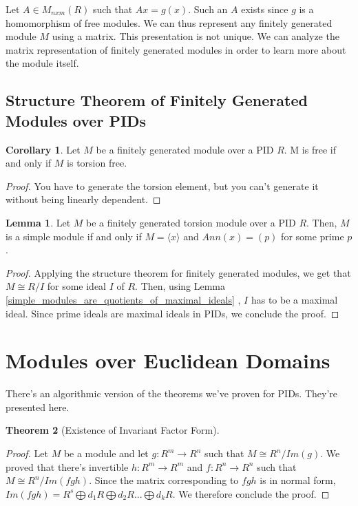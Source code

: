 \documentclass{article}
\theoremstyle{definition}
\newtheorem{theorem}{Theorem}[section]
\newtheorem{lemma}[theorem]{Lemma}
\newtheorem{corollary}{Corollary}[theorem]
\begin{document}
Let $A \in M_{nxm}(R)$ such that $Ax = g(x)$. Such an $A$ exists since $g$ is 
a homomorphism of free modules. We can thus represent any finitely generated module $M$
using a matrix. This presentation is not unique. We can analyze the matrix representation of finitely
generated modules in order to learn more about the module itself.

\subsection{Structure Theorem of Finitely Generated Modules over PIDs}

\begin{corollary}
    Let $M$ be a finitely generated module over a PID $R$. M is free if and only if
    $M$ is torsion free.
\end{corollary}
\begin{proof}
    You have to generate the torsion element, but you can't generate it without being
    linearly dependent.
\end{proof}

\begin{lemma}
    Let $M$ be a finitely generated torsion module over a PID $R$.
    Then, $M$ is a simple module if and only if $M = \langle x \rangle$ and $Ann(x) = (p)$
    for some prime $p$.
\end{lemma}
\begin{proof}
    Applying the structure theorem for finitely generated modules, we get that
    $M \cong R/I$ for some ideal $I$ of $R$. Then, using Lemma 
    \ref{simple_modules_are_quotients_of_maximal_ideals}
    , $I$ has to be a maximal ideal. Since prime ideals are maximal ideals in PIDs, we conclude the proof.
\end{proof}

\newpage

\section{Modules over Euclidean Domains}

There's an algorithmic version of the theorems we've proven for PIDs. They're presented here.

\begin{theorem}[Existence of Invariant Factor Form]
    
\end{theorem}
\begin{proof}
    Let $M$ be a module and let $g: R^{m} \xrightarrow{} R^{n}$ such that $M \cong R^{n}/Im(g)$. We proved that there's invertible $h: R^{m} \xrightarrow{} R^{m}$ and $f: R^{n} \xrightarrow{} R^{n}$ such that $M \cong R^{n}/Im(fgh)$. Since the matrix corresponding to $fgh$ is in normal form, $Im(fgh) = R^{s} \bigoplus d_{1}R \bigoplus d_{2}R ... \bigoplus d_{k}R$. We therefore conclude the proof.
\end{proof}
\end{document}
